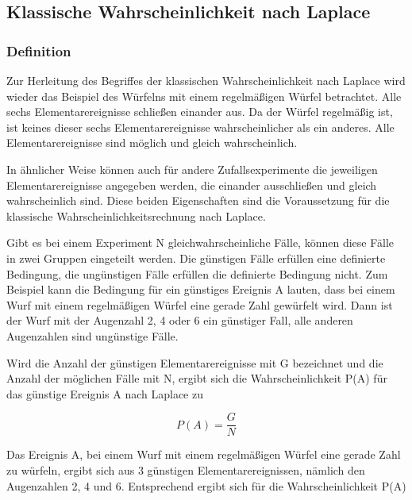 \clearpage

\subsection{Klassische Wahrscheinlichkeit nach Laplace}
\subsubsection{Definition}

\noindent Zur Herleitung des Begriffes der klassischen Wahrscheinlichkeit nach Laplace wird wieder das Beispiel des W\"{u}rfelns mit einem regelm\"{a}{\ss}igen W\"{u}rfel betrachtet. Alle sechs Elementarereignisse schlie{\ss}en einander aus. Da der W\"{u}rfel regelm\"{a}{\ss}ig ist, ist keines dieser sechs Elementarereignisse wahrscheinlicher als ein anderes. Alle Elementarereignisse sind m\"{o}glich und gleich wahrscheinlich. \newline

\noindent In \"{a}hnlicher Weise k\"{o}nnen auch f\"{u}r andere Zufallsexperimente die jeweiligen Elementarereignisse angegeben werden, die einander ausschlie{\ss}en und gleich wahrscheinlich sind. Diese beiden Eigenschaften sind die Voraussetzung f\"{u}r die klassische Wahrscheinlichkeitsrechnung nach Laplace.\newline

\noindent Gibt es bei einem Experiment N gleichwahrscheinliche F\"{a}lle, k\"{o}nnen diese F\"{a}lle in zwei Gruppen eingeteilt werden. Die g\"{u}nstigen F\"{a}lle erf\"{u}llen eine definierte Bedingung, die ung\"{u}nstigen F\"{a}lle erf\"{u}llen die definierte Bedingung nicht. Zum Beispiel kann die Bedingung f\"{u}r ein g\"{u}nstiges Ereignis A lauten, dass bei einem Wurf mit einem regelm\"{a}{\ss}igen W\"{u}rfel eine gerade Zahl gew\"{u}rfelt wird. Dann ist der Wurf mit der Augenzahl 2, 4 oder 6 ein g\"{u}nstiger Fall, alle anderen Augenzahlen sind ung\"{u}nstige F\"{a}lle. \newline

\noindent Wird die Anzahl der g\"{u}nstigen Elementarereignisse mit G bezeichnet und die Anzahl der m\"{o}glichen F\"{a}lle mit N, ergibt sich die Wahrscheinlichkeit P(A) f\"{u}r das g\"{u}nstige Ereignis A nach Laplace zu

\begin{equation}\label{eq:twoseventeen}
P(A)=\dfrac{G}{N} 
\end{equation}

\noindent Das Ereignis A, bei einem Wurf mit einem regelm\"{a}{\ss}igen W\"{u}rfel eine gerade Zahl zu w\"{u}rfeln, ergibt sich aus 3 g\"{u}nstigen Elementarereignissen, n\"{a}mlich den Augenzahlen 2, 4 und 6. Entsprechend ergibt sich f\"{u}r die Wahrscheinlichkeit P(A)

